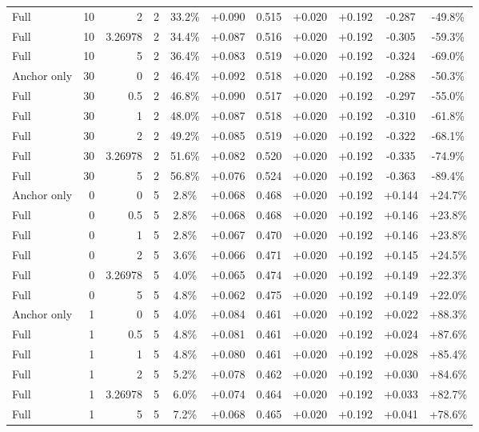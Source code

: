 \begin{table}[htbp]
\begin{tabular}{lrrrccccccc}
Full & 10 & 2 & 2 & 33.2\% & +0.090 & 0.515 & +0.020 & +0.192 & -0.287 & -49.8\% \\
Full & 10 & 3.26978 & 2 & 34.4\% & +0.087 & 0.516 & +0.020 & +0.192 & -0.305 & -59.3\% \\
Full & 10 & 5 & 2 & 36.4\% & +0.083 & 0.519 & +0.020 & +0.192 & -0.324 & -69.0\% \\
Anchor only & 30 & 0 & 2 & 46.4\% & +0.092 & 0.518 & +0.020 & +0.192 & -0.288 & -50.3\% \\
Full & 30 & 0.5 & 2 & 46.8\% & +0.090 & 0.517 & +0.020 & +0.192 & -0.297 & -55.0\% \\
Full & 30 & 1 & 2 & 48.0\% & +0.087 & 0.518 & +0.020 & +0.192 & -0.310 & -61.8\% \\
Full & 30 & 2 & 2 & 49.2\% & +0.085 & 0.519 & +0.020 & +0.192 & -0.322 & -68.1\% \\
Full & 30 & 3.26978 & 2 & 51.6\% & +0.082 & 0.520 & +0.020 & +0.192 & -0.335 & -74.9\% \\
Full & 30 & 5 & 2 & 56.8\% & +0.076 & 0.524 & +0.020 & +0.192 & -0.363 & -89.4\% \\
Anchor only & 0 & 0 & 5 & 2.8\% & +0.068 & 0.468 & +0.020 & +0.192 & +0.144 & +24.7\% \\
Full & 0 & 0.5 & 5 & 2.8\% & +0.068 & 0.468 & +0.020 & +0.192 & +0.146 & +23.8\% \\
Full & 0 & 1 & 5 & 2.8\% & +0.067 & 0.470 & +0.020 & +0.192 & +0.146 & +23.8\% \\
Full & 0 & 2 & 5 & 3.6\% & +0.066 & 0.471 & +0.020 & +0.192 & +0.145 & +24.5\% \\
Full & 0 & 3.26978 & 5 & 4.0\% & +0.065 & 0.474 & +0.020 & +0.192 & +0.149 & +22.3\% \\
Full & 0 & 5 & 5 & 4.8\% & +0.062 & 0.475 & +0.020 & +0.192 & +0.149 & +22.0\% \\
Anchor only & 1 & 0 & 5 & 4.0\% & +0.084 & 0.461 & +0.020 & +0.192 & +0.022 & +88.3\% \\
Full & 1 & 0.5 & 5 & 4.8\% & +0.081 & 0.461 & +0.020 & +0.192 & +0.024 & +87.6\% \\
Full & 1 & 1 & 5 & 4.8\% & +0.080 & 0.461 & +0.020 & +0.192 & +0.028 & +85.4\% \\
Full & 1 & 2 & 5 & 5.2\% & +0.078 & 0.462 & +0.020 & +0.192 & +0.030 & +84.6\% \\
Full & 1 & 3.26978 & 5 & 6.0\% & +0.074 & 0.464 & +0.020 & +0.192 & +0.033 & +82.7\% \\
Full & 1 & 5 & 5 & 7.2\% & +0.068 & 0.465 & +0.020 & +0.192 & +0.041 & +78.6\% \\

\end{tabular}
\end{table}
